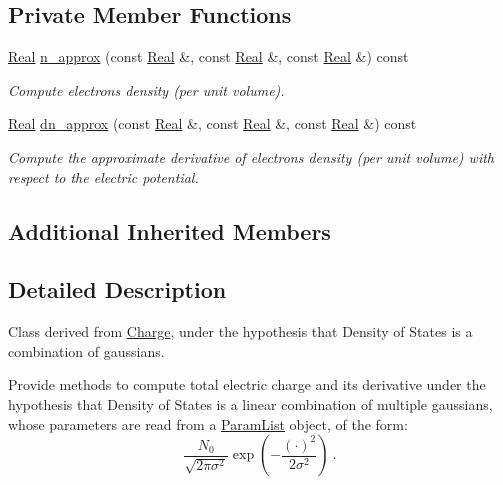 \subsection*{Private Member Functions}
\begin{DoxyCompactItemize}
\item 
\hyperlink{typedefs_8h_a060b837c3b4486ee35317744156f3da2}{Real} \hyperlink{classGaussianCharge_a91f27044b2f7ced7c2330153bb9da652}{n\-\_\-approx} (const \hyperlink{typedefs_8h_a060b837c3b4486ee35317744156f3da2}{Real} \&, const \hyperlink{typedefs_8h_a060b837c3b4486ee35317744156f3da2}{Real} \&, const \hyperlink{typedefs_8h_a060b837c3b4486ee35317744156f3da2}{Real} \&) const 
\begin{DoxyCompactList}\small\item\em Compute electrons density (per unit volume). \end{DoxyCompactList}\item 
\hyperlink{typedefs_8h_a060b837c3b4486ee35317744156f3da2}{Real} \hyperlink{classGaussianCharge_ab5ce245792f1b0d7c2038ebc75bbc758}{dn\-\_\-approx} (const \hyperlink{typedefs_8h_a060b837c3b4486ee35317744156f3da2}{Real} \&, const \hyperlink{typedefs_8h_a060b837c3b4486ee35317744156f3da2}{Real} \&, const \hyperlink{typedefs_8h_a060b837c3b4486ee35317744156f3da2}{Real} \&) const 
\begin{DoxyCompactList}\small\item\em Compute the approximate derivative of electrons density (per unit volume) with respect to the electric potential. \end{DoxyCompactList}\end{DoxyCompactItemize}
\subsection*{Additional Inherited Members}


\subsection{Detailed Description}
Class derived from \hyperlink{classCharge}{Charge}, under the hypothesis that Density of States is a combination of gaussians. 

Provide methods to compute total electric charge and its derivative under the hypothesis that Density of States is a linear combination of multiple gaussians, whose parameters are read from a \hyperlink{classParamList}{Param\-List} object, of the form\-: \[ \frac{N_0}{\sqrt{2\pi\sigma^2}}\exp\left(-\frac{\left(\cdot\right)^2}{2\sigma^2}\right) ~ . \] 

